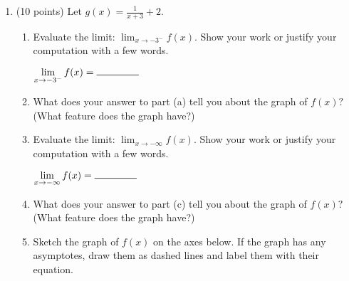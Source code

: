 \documentclass[11pt]{article}
\renewcommand{\d}{\displaystyle}
\begin{document}
\begin{enumerate}
\item (10 points) Let $g(x)=\frac{1}{x+3}+2.$
	\begin{enumerate}
	

		\item Evaluate the limit: $\d{\lim_{x \to -3^-} f(x)}.$  Show your work or justify your computation with a few words.	
	\vfill
	
	\hfill $\d{\lim_{x \to -3^-} f(x)} = \ans$
	
	\bigskip
	
	\item What does your answer to part (a) tell you about the graph of $f(x)?$ (What feature does the graph have?)
	\vspace{0.5in}
	\item Evaluate the limit: $\d{\lim_{x \to - \infty} f(x)}.$  Show your work or justify your computation with a few words.
	
		\vfill
		
		\hfill$\d{\lim_{x \to - \infty} f(x)} = \ans$
		
		\bigskip
	\item What does your answer to part (c) tell you about the graph of $f(x)?$ (What feature does the graph have?)
	\vspace{0.5in}
	
	\item Sketch the graph of $f(x)$ on the axes below. If the graph has any asymptotes, draw them as dashed lines and label them with their equation. \\
	
\vspace{.25in}
	
	
	\end{enumerate} 
	\newpage
	


\newpage




\end{enumerate}
\end{document}
